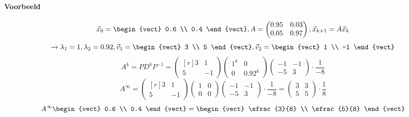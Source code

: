 \paragraph{Voorbeeld}
\[ \vec{x}_0 = \begin{vect} 0.6 \\ 0.4 \end{vect}, A = \begin{pmatrix} 0.95 & 0.03 \\ 0.05 & 0.97 \end{pmatrix}, \vec{x}_{k+1} = A \vec{x}_k \]
\[ \to \lambda_1 = 1, \lambda_2 = 0.92, \vec{v}_1 = \begin{vect} 3 \\ 5 \end{vect}, \vec{v}_2 = \begin{vect} 1 \\ -1 \end{vect} \]
\[ A^k = PD^kP^{-1} = \begin{pmatrix*}[r] 3 & 1 \\ 5 & -1 \end{pmatrix*} \begin{pmatrix} 1^k & 0 \\ 0 & 0.92^k \end{pmatrix} \begin{pmatrix} -1 & -1 \\ -5 & 3 \end{pmatrix} \cdot \frac{1}{-8} \]
\[ A^\infty = \begin{pmatrix*}[r] 3 & 1 \\ 5 & -1 \end{pmatrix*} \begin{pmatrix} 1 & 0 \\ 0 & 0 \end{pmatrix} \begin{pmatrix} -1 & -1 \\ -5 & 3 \end{pmatrix} \cdot \frac{1}{-8} = \begin{pmatrix} 3 & 3 \\ 5 & 5 \end{pmatrix} \cdot \frac{1}{8} \]
\[ A^\infty \begin{vect} 0.6 \\ 0.4 \end{vect} = \begin{vect} \sfrac{3}{8} \\ \sfrac{5}{8} \end{vect} \]